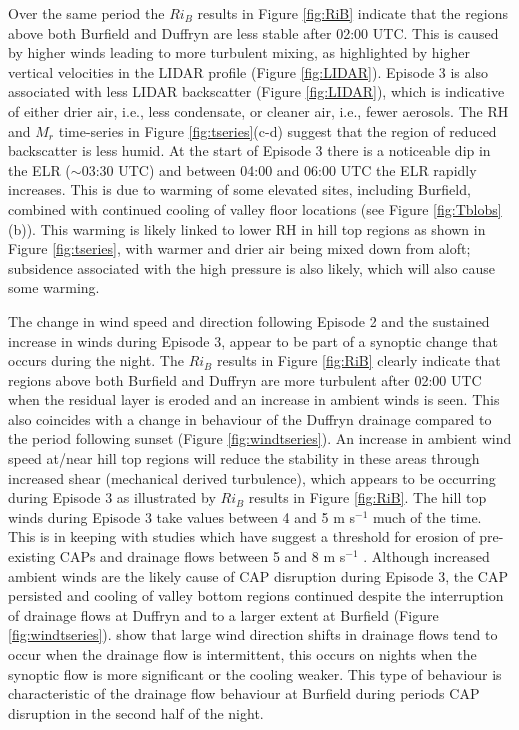 \documentclass[times]{qjrms4}
\begin{document}
Over the same period the $Ri_B$ results in Figure \ref{fig:RiB} indicate that the regions above both Burfield and Duffryn are less stable after 02:00 UTC. This is caused by higher winds leading to more turbulent mixing, as highlighted by higher vertical velocities in the LIDAR profile (Figure \ref{fig:LIDAR}). Episode 3 is also associated with less LIDAR backscatter (Figure \ref{fig:LIDAR}), which is indicative of either drier air, i.e., less condensate, or cleaner air, i.e., fewer aerosols. The RH and $M_r$ time-series in Figure \ref{fig:tseries}(c-d) suggest that the region of reduced backscatter is less humid. At the start of Episode 3 there is a noticeable dip in the ELR ($\sim$03:30 UTC) and between 04:00 and 06:00 UTC the ELR rapidly increases. This is due to warming of some elevated sites, including Burfield, combined with continued cooling of valley floor locations (see Figure \ref{fig:Tblobs}(b)). This warming is likely linked to lower RH in hill top regions as shown in Figure \ref{fig:tseries}, with warmer and drier air being mixed down from aloft; subsidence associated with the high pressure is also likely, which will also cause some warming.

The change in wind speed and direction following Episode 2 and the sustained increase in winds during Episode 3, appear to be part of a synoptic change that occurs during the night. The $Ri_B$ results in Figure \ref{fig:RiB} clearly indicate that regions above both Burfield and Duffryn are more turbulent after 02:00 UTC when the residual layer is eroded and an increase in ambient winds is seen. This also coincides with a change in behaviour of the Duffryn drainage compared to the period following sunset (Figure \ref{fig:windtseries}). An increase in ambient wind speed at/near hill top regions will reduce the stability in these areas through increased shear (mechanical derived turbulence), which appears to be occurring during Episode 3 as illustrated by $Ri_B$ results in Figure \ref{fig:RiB}. The hill top winds during Episode 3 take values between 4 and 5 m s$^{-1}$ much of the time. This is in keeping with studies which have suggest a threshold for erosion of pre-existing CAPs and drainage flows between 5 and 8 m s$^{-1}$ \citep{barr1989influence,orgill1992mesoscale,bogren2000local,iijima2000seasonal,whiteman2001cold,vosper2008numerical}. Although increased ambient winds are the likely cause of CAP disruption during Episode 3, the CAP persisted and cooling of valley bottom regions continued despite the interruption of drainage flows at Duffryn and to a larger extent at Burfield (Figure \ref{fig:windtseries}). \citet{mahrt2010non} show that large wind direction shifts in drainage flows tend to occur when the drainage flow is intermittent, this occurs on nights when the synoptic flow is more significant or the cooling weaker. This type of behaviour is characteristic of the drainage flow behaviour at Burfield during periods CAP disruption in the second half of the night.
\end{document}
